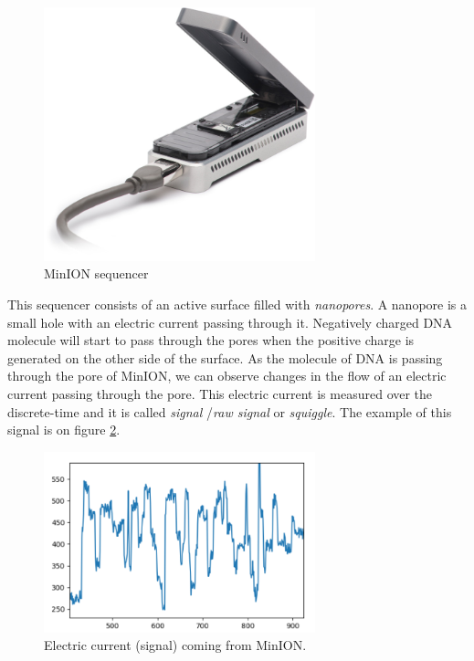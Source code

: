 \begin{figure}
\centerline{\includegraphics[width=0.7\textwidth, height=0.3\textheight]{images/minion}}
\caption[MinION]{MinION sequencer}
\label{obr:minIon}
\end{figure}

This sequencer consists of an active surface filled with \textit{nanopores}. A nanopore
is a small hole with an electric current passing through it. Negatively charged DNA molecule
will start to pass through the pores when the positive charge is generated on the
other side of the surface. As the molecule of DNA is passing through the pore of
MinION, we can observe changes in the flow of an electric current passing through the pore.
This electric current is measured over the discrete-time and it is called \textit{signal}
/\textit{raw signal} or \textit{squiggle}. The example of this signal is on figure \ref{obr:minIonCurrent}.

\begin{figure}
\centerline{\includegraphics[width=0.7\textwidth, height=0.3\textheight]{images/signal}}
\caption[MinION signal]{Electric current (signal) coming from MinION.}
\label{obr:minIonCurrent}
\end{figure}

